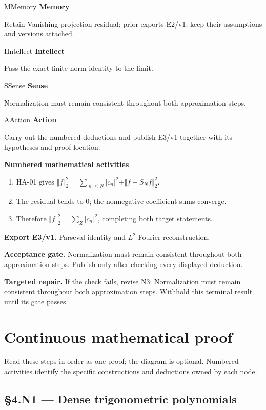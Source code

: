 \documentclass[preprint,12pt,aps,pra,showkeys,amsmath,amssymb,superscriptaddress,floatfix]{revtex4-2}
\theoremstyle{definition}
\theoremstyle{remark}
\newcommand{\mmfaculty}[3]{%
 \begin{mmfacultybox}{#1}{#2}
 {\sffamily\bfseries\color{MMBlue}#2}\par\smallskip #3
 \end{mmfacultybox}}
\newcommand{\field}[2]{\par\smallskip\noindent\textbf{#1.} #2\par}
\begin{document}
\mmfaculty{M}{Memory}{Retain Vanishing projection residual; prior exports E2/v1; keep their
assumptions and versions attached.}

\mmfaculty{I}{Intellect}{Pass the exact finite norm identity to the limit.}

\mmfaculty{S}{Sense}{Normalization must remain consistent throughout both approximation
steps.}

\mmfaculty{A}{Action}{Carry out the numbered deductions and publish E3/v1 together with its
hypotheses and proof location.}

\smallskip\noindent\textbf{Numbered mathematical activities}

\begin{enumerate}[label=N3.\arabic*,leftmargin=3.4em]

\item HA-01 gives
\(\Vert f\Vert _{2}^{2}=\sum _{|n|\le N}|c_n|^{2}+\Vert f-S_Nf\Vert _{2}^{2}\).

\item The residual tends to 0; the nonnegative coefficient sums converge.

\item Therefore \(\Vert f\Vert _{2}^{2}=\sum _Z|c_n|^{2}\), completing both
target statements.

\end{enumerate}

\field{Export E3/v1}{Parseval identity and \(L^{2}\) Fourier reconstruction.}

\field{Acceptance gate}{Normalization must remain consistent throughout both approximation
steps. Publish only after checking every displayed deduction.}

\field{Targeted repair}{If the check fails, revise N3: Normalization must remain consistent
throughout both approximation steps. Withhold this terminal result until
its gate passes.}

\endgroup\clearpage\section{Continuous mathematical proof}\label{sec:proof}

Read these steps in order as one proof; the diagram is optional.
Numbered activities identify the specific constructions and deductions
owned by each node.

\subsection{§4.N1 --- Dense trigonometric
polynomials}\label{n1-dense-trigonometric-polynomials}
\end{document}
